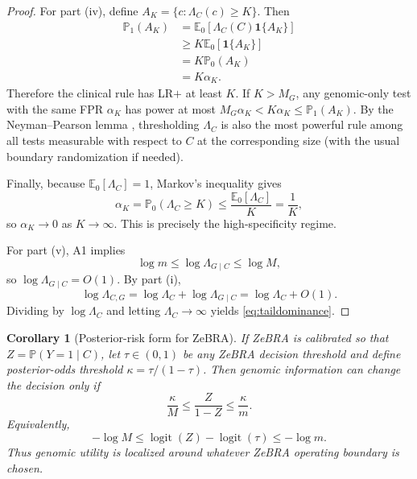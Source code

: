 \documentclass[journal]{IEEEtran}
\newtheorem{corollary}{Corollary}
\newcommand{\Pone}{\mathbb{P}_1}
\newcommand{\Pzero}{\mathbb{P}_0}
\newcommand{\Ezero}{\mathbb{E}_0}
\newcommand{\LR}{\Lambda}
\newcommand{\ind}{\mathbf{1}}
\begin{document}
\begin{proof}
For part (iv), define $A_K=\{c:\LR_C(c)\ge K\}$. Then
\begin{align}
\Pone(A_K)
&=\Ezero[\LR_C(C)\ind\{A_K\}]\\
&\ge K\Ezero[\ind\{A_K\}]\\
&=K\Pzero(A_K)\\
&=K\alpha_K.
\end{align}
Therefore the clinical rule has LR$+$ at least $K$. If $K>M_G$, any genomic-only test with the same FPR $\alpha_K$ has power at most $M_G\alpha_K<K\alpha_K\le\Pone(A_K)$. By the Neyman--Pearson lemma \cite{NeymanPearson1933}, thresholding $\LR_C$ is also the most powerful rule among all tests measurable with respect to $C$ at the corresponding size (with the usual boundary randomization if needed).

Finally, because $\Ezero[\LR_C]=1$, Markov's inequality gives
\begin{equation}
\alpha_K
=\Pzero(\LR_C\ge K)
\le\frac{\Ezero[\LR_C]}{K}
=\frac{1}{K},
\end{equation}
so $\alpha_K\to0$ as $K\to\infty$. This is precisely the high-specificity regime.

For part (v), A1 implies
\begin{equation}
\log m\le\log\LR_{G\mid C}\le\log M,
\end{equation}
so $\log\LR_{G\mid C}=O(1)$. By part (i),
\begin{equation}
\log\LR_{C,G}
=\log\LR_C+\log\LR_{G\mid C}
=\log\LR_C+O(1).
\end{equation}
Dividing by $\log\LR_C$ and letting $\LR_C\to\infty$ yields \eqref{eq:taildominance}.
\end{proof}

\begin{corollary}[Posterior-risk form for ZeBRA]
\label{cor:zebra}
If ZeBRA is calibrated so that $Z=\mathbb{P}(Y=1\mid C)$, let $\tau\in(0,1)$ be any ZeBRA decision threshold and define posterior-odds threshold $\kappa=\tau/(1-\tau)$. Then genomic information can change the decision only if
\begin{equation}
\boxed{
\frac{\kappa}{M}
\le
\frac{Z}{1-Z}
\le
\frac{\kappa}{m}.
}
\label{eq:zboundary}
\end{equation}
Equivalently,
\begin{equation}
-\log M
\le
\operatorname{logit}(Z)-\operatorname{logit}(\tau)
\le
-\log m.
\end{equation}
Thus genomic utility is localized around \emph{whatever} ZeBRA operating boundary is chosen.
\end{corollary}
\end{document}
